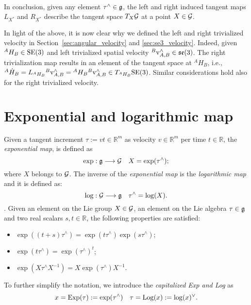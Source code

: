 In conclusion, given any element $\tau^\wedge \in \mathfrak{g}$, the left and right induced tangent maps $L_{X^*}$ and $R_{X^*}$ describe the tangent space $T_X\mathcal{G}$ at a point $X \in \mathcal{G}$.
\par
In light of the above, it is now clear why we defined the left and right trivialized velocity in Section~\ref{sec:angular_velocity} and \ref{sec:se3_velocity}.
Indeed, given ${}^A H_B\in{\mathrm{SE}}(3)$ and left trivialized spatial velocity ${}^B \mathrm{v}_{A,B}^\wedge \in \mathfrak{se}(3)$. The right trivialization map results in an element of the tangent space at ${}^A H_B$, i.e., ${}^A \dot{H}_B = L_{{}^A H_B} {}^B \mathrm{v}_{A,B}^\wedge = {}^A H_B {}^B \mathrm{v}_{A,B}^\wedge \in T_{{}^A H_B} {\mathrm{SE}}(3)$. Similar considerations hold also for the right trivialized velocity. 


\section{Exponential and logarithmic map\label{sec:exp_and_log_maps}} Given a tangent increment $\tau := vt \in \mathbb{R}^m$ as velocity $v\in\mathbb{R}^m$ per time $t \in \mathbb{R}$, the \emph{exponential map}, is defined as 
\begin{equation}
    \text{exp}: \mathfrak{g} \longrightarrow \mathcal{G} \quad X = \exp(\tau ^\wedge);
\end{equation}
where $X$ belongs to $\mathcal{G}$. The inverse of the \emph{exponential map} is the \emph{logarithmic map} and it is defined as:
\begin{equation}
    \text{log}:  \mathcal{G} \longrightarrow  \mathfrak{g} \quad \tau ^\wedge = \log(X).
\end{equation}.
Given an element on the Lie group $X \in \mathcal{G}$, an element on the Lie algebra $\tau \in \mathfrak{g}$ and two real scalars $s, t \in \mathbb{R}$, the following properties are satisfied:
\begin{itemize}
    \item $\exp((t + s ) \tau ^\wedge) = \exp(t \tau ^\wedge) \exp( s \tau ^\wedge)$;
    \item $\exp(t \tau ^\wedge) = \exp(\tau ^\wedge) ^t$;
    \item $\exp(X \tau ^\wedge X^{-1}) = X \exp(\tau ^\wedge) X ^{-1}$.
\end{itemize}
\par
To further simplify the notation, we introduce the \emph{capitalized Exp and Log} as 
\begin{equation}
    x = \operatorname{Exp}(\tau) := \exp(\tau ^\wedge) \quad \tau = \operatorname{Log}(x) := \log(x) ^\vee.
\end{equation}
\par

